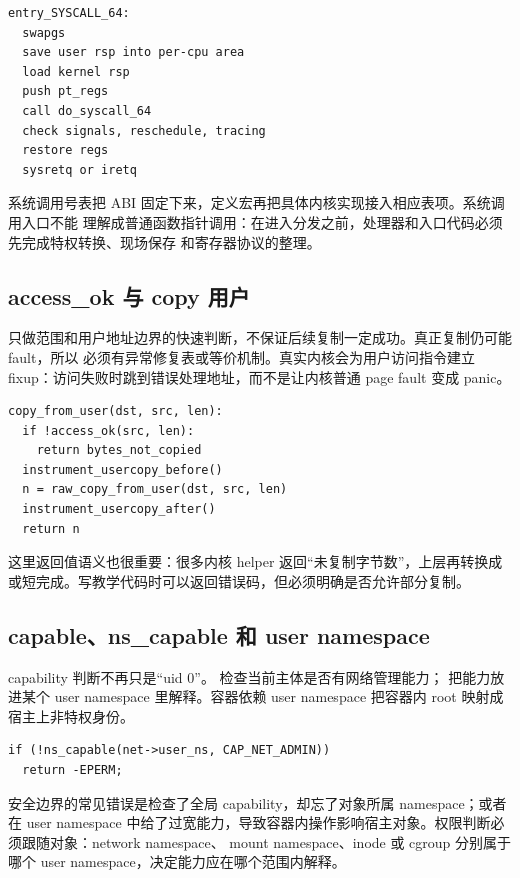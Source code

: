 \begin{lstlisting}
entry_SYSCALL_64:
  swapgs
  save user rsp into per-cpu area
  load kernel rsp
  push pt_regs
  call do_syscall_64
  check signals, reschedule, tracing
  restore regs
  sysretq or iretq
\end{lstlisting}

系统调用号表把 ABI 固定下来，定义宏再把具体内核实现接入相应表项。系统调用入口不能
理解成普通函数指针调用：在进入分发之前，处理器和入口代码必须先完成特权转换、现场保存
和寄存器协议的整理。

\subsection{access\_ok 与 copy 用户}

 只做范围和用户地址边界的快速判断，不保证后续复制一定成功。真正复制仍可能 fault，所以  必须有异常修复表或等价机制。真实内核会为用户访问指令建立 fixup：访问失败时跳到错误处理地址，而不是让内核普通 page fault 变成 panic。

\begin{lstlisting}
copy_from_user(dst, src, len):
  if !access_ok(src, len):
    return bytes_not_copied
  instrument_usercopy_before()
  n = raw_copy_from_user(dst, src, len)
  instrument_usercopy_after()
  return n
\end{lstlisting}

这里返回值语义也很重要：很多内核 helper 返回“未复制字节数”，上层再转换成  或短完成。写教学代码时可以返回错误码，但必须明确是否允许部分复制。

\subsection{capable、ns\_capable 和 user namespace}

capability 判断不再只是“uid 0”。 检查当前主体是否有网络管理能力； 把能力放进某个 user namespace 里解释。容器依赖 user namespace 把容器内 root 映射成宿主上非特权身份。

\begin{lstlisting}
if (!ns_capable(net->user_ns, CAP_NET_ADMIN))
  return -EPERM;
\end{lstlisting}

安全边界的常见错误是检查了全局 capability，却忘了对象所属 namespace；或者在 user namespace
中给了过宽能力，导致容器内操作影响宿主对象。权限判断必须跟随对象：network namespace、
mount namespace、inode 或 cgroup 分别属于哪个 user namespace，决定能力应在哪个范围内解释。

